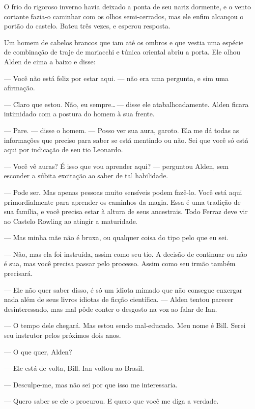O frio do rigoroso inverno havia deixado a ponta de seu nariz dormente, e o
vento cortante fazia-o caminhar com os olhos semi-cerrados, mas ele enfim
alcançou o portão do castelo. Bateu três vezes, e esperou resposta.

Um homem de cabelos brancos que iam até os ombros e que vestia uma espécie de
combinação de traje de mariacchi e túnica oriental abriu a porta. Ele olhou
Alden de cima a baixo e disse:

--- Você não está feliz por estar aqui. --- não era uma pergunta, e sim uma
afirmação.

--- Claro que estou. Não, eu sempre\ldots\,--- disse ele atabalhoadamente.
Alden ficara intimidado com a postura do homem à sua frente.

--- Pare. --- disse o homem. --- Posso ver sua aura, garoto. Ela me dá todas as
informações que preciso para saber se está mentindo ou não. Sei que você só
está aqui por indicação de seu tio Leonardo.

--- Você vê auras? É isso que vou aprender aqui? --- perguntou Alden, sem
esconder a súbita excitação ao saber de tal habilidade.

--- Pode ser. Mas apenas pessoas muito sensíveis podem fazê-lo. Você está aqui
primordialmente para aprender os caminhos da magia. Essa é uma tradição de sua
família, e você precisa estar à altura de seus ancestrais. Todo Ferraz deve vir
ao Castelo Rowling ao atingir a maturidade.

--- Mas minha mãe não é bruxa, ou qualquer coisa do tipo pelo que eu sei.

--- Não, mas ela foi instruída, assim como seu tio. A decisão de continuar ou
não é sua, mas você precisa passar pelo processo. Assim como seu irmão também
precisará.

--- Ele não quer saber disso, é só um idiota mimado que não consegue enxergar
nada além de seus livros idiotas de ficção científica. --- Alden tentou parecer
desinteressado, mas mal pôde conter o desgosto na voz ao falar de Ian.

--- O tempo dele chegará. Mas estou sendo mal-educado. Meu nome é Bill. Serei
seu instrutor pelos próximos dois anos.


--- O que quer, Alden?

--- Ele está de volta, Bill. Ian voltou ao Brasil.

--- Desculpe-me, mas não sei por que isso me interessaria.

--- Quero saber se ele o procurou. E quero que você me diga a verdade.

